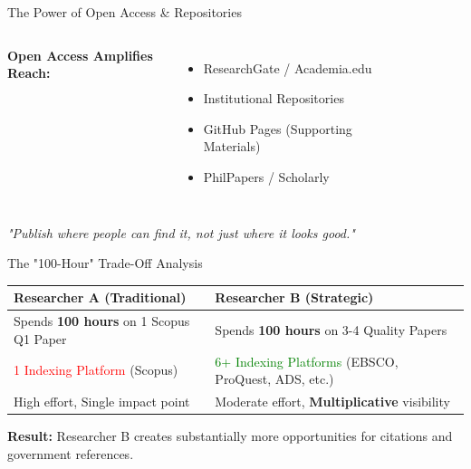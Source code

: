 \documentclass[10pt, aspectratio=169]{beamer}
\begin{document}
	\begin{frame}{The Power of Open Access \& Repositories}
		\begin{columns}
			\textbf{Open Access Amplifies Reach:}
			\begin{itemize}
				\item ResearchGate / Academia.edu
				\item Institutional Repositories
				\item GitHub Pages (Supporting Materials)
				\item PhilPapers / Scholarly
			\end{itemize}
			\begin{figure}
				\centering
			\end{figure}
		\end{columns}
		\vspace{0.3cm}
		\begin{center}
			\textit{"Publish where people can find it, not just where it looks good."}
		\end{center}
	\end{frame}
	
	\begin{frame}{The "100-Hour" Trade-Off Analysis}
		\begin{table}
			\centering
			\begin{tabular}{p{4cm} p{4cm}}
				\toprule
				\textbf{Researcher A (Traditional)} & \textbf{Researcher B (Strategic)} \\
				\midrule
				Spends \textbf{100 hours} on 1 Scopus Q1 Paper & Spends \textbf{100 hours} on 3-4 Quality Papers \\
				\midrule
				\textcolor{red}{1 Indexing Platform} (Scopus) & \textcolor{green}{6+ Indexing Platforms} (EBSCO, ProQuest, ADS, etc.) \\
				\midrule
				High effort, Single impact point & Moderate effort, \textbf{Multiplicative} visibility \\
				\bottomrule
			\end{tabular}
		\end{table}
		\vspace{0.5cm}
		\begin{center}
			\textbf{Result:} Researcher B creates substantially more opportunities for \textcolor{myorange}{citations} and \textcolor{myorange}{government references}.
		\end{center}
	\end{frame}
	
\end{document}
